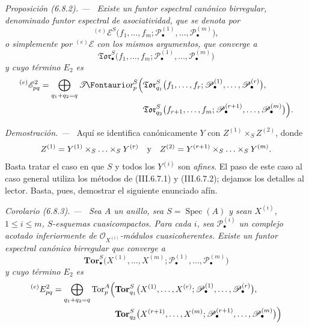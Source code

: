 \documentclass[10pt,oneside]{book}
\makeatletter
\newcommand{\sh}[1]{\mathscr{#1}}
\newcommand*{\ega@sheafop}[3]{\sh{#1}#2\textup{\kern-2.2pt{\Fontauri\slshape #3}}}
\newcommand{\shTor}{\ega@sheafop{T}{}{or}}
\newcommand{\Spec}{\operatorname{Spec}}
\newcommand{\Tor}{\operatorname{Tor}}
\newcommand{\sref}[2][]{\textup{(#2)}}
\newenvironment{proposition}[1][]{\par\medskip\noindent\itshape Proposición (#1). ---\ }{\par}
\newenvironment{corollary}[1][]{\par\medskip\noindent\itshape Corolario (#1). ---\ }{\par}
\newenvironment{proof}{\par\medskip\noindent\textit{Demostración. ---\ }}{\par}
\makeatother
\begin{document}
\begin{proposition}[6.8.2]
\label{III.6.8.2}
Existe un funtor espectral canónico birregular, denominado
\emph{funtor espectral de asociatividad}, que se denota por
\[
  {}^{(e)}\sh E^S
  \bigl(
    f_1,\ldots,f_m;
    \sh P_\bullet^{(1)},\ldots,\sh P_\bullet^{(m)}
  \bigr),
\]
o simplemente por ${}^{(e)}\sh E$ con los mismos argumentos, que
converge a
\[
  \mathfrak{Tor}_\bullet^S
  \bigl(
    f_1,\ldots,f_m;
    \sh P_\bullet^{(1)},\ldots,\sh P_\bullet^{(m)}
  \bigr)
\]
y cuyo término $E_2$ es
\[
\begin{split}
  {}^{(e)}\sh E_{pq}^2
  =
  \bigoplus_{q_1+q_2=q}
  \shTor_p^S
  \Bigl(
    &
    \mathfrak{Tor}_{q_1}^S
    \bigl(
      f_1,\ldots,f_r;
      \sh P_\bullet^{(1)},\ldots,\sh P_\bullet^{(r)}
    \bigr),
    \\
    &
    \mathfrak{Tor}_{q_2}^S
    \bigl(
      f_{r+1},\ldots,f_m;
      \sh P_\bullet^{(r+1)},\ldots,\sh P_\bullet^{(m)}
    \bigr)
  \Bigr).
\end{split}
\]
\end{proposition}

\begin{proof}
Aquí se identifica canónicamente $Y$ con
$Z^{(1)}\times_SZ^{(2)}$, donde
\[
  Z^{(1)}
  =
  Y^{(1)}\times_S\ldots\times_SY^{(r)}
  \quad\hbox{y}\quad
  Z^{(2)}
  =
  Y^{(r+1)}\times_S\ldots\times_SY^{(m)}.
\]
Basta tratar el caso en que $S$ y todos los $Y^{(i)}$ son \emph{afines}.
El paso de este caso al caso general utiliza los métodos de
\sref{III.6.7.1} y \sref{III.6.7.2}; dejamos los detalles al
lector. Basta, pues, demostrar el siguiente enunciado afín.
\end{proof}

\begin{corollary}[6.8.3]
\label{III.6.8.3}
Sea $A$ un anillo, sea $S=\Spec(A)$ y sean $X^{(i)}$,
$1\leq i\leq m$, $S$-esquemas cuasicompactos. Para cada $i$, sea
$\sh P_\bullet^{(i)}$ un complejo acotado inferiormente de
$\sh O_{X^{(i)}}$-módulos cuasicoherentes. Existe un funtor
espectral canónico birregular que converge a
\[
  \mathbf{Tor}_\bullet^S
  \bigl(
    X^{(1)},\ldots,X^{(m)};
    \sh P_\bullet^{(1)},\ldots,\sh P_\bullet^{(m)}
  \bigr)
\]
y cuyo término $E_2$ es
\[
\begin{split}
  {}^{(e)}E_{pq}^2
  =
  \bigoplus_{q_1+q_2=q}
  \Tor_p^A
  \Bigl(
    &
    \mathbf{Tor}_{q_1}^S
    \bigl(
      X^{(1)},\ldots,X^{(r)};
      \sh P_\bullet^{(1)},\ldots,\sh P_\bullet^{(r)}
    \bigr),
    \\
    &
    \mathbf{Tor}_{q_2}^S
    \bigl(
      X^{(r+1)},\ldots,X^{(m)};
      \sh P_\bullet^{(r+1)},\ldots,\sh P_\bullet^{(m)}
    \bigr)
  \Bigr)
\end{split}
\]
\end{corollary}
\end{document}
